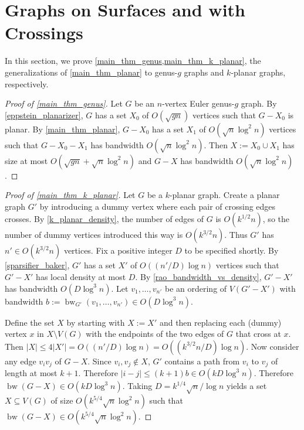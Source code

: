 \documentclass{patmorin}
\renewcommand{\le}{\leqslant}
\DeclareMathOperator{\bw}{bw}
\begin{document}
\section{Graphs on Surfaces and with Crossings}
\label{genus_section}
\label{k_planar_section}

In this section, we prove \cref{main_thm_genus,main_thm_k_planar}, the generalizations of \cref{main_thm_planar} to genus-$g$ graphs and $k$-planar graphs, respectively.

\begin{proof}[Proof of \cref{main_thm_genus}]
  Let $G$ be an $n$-vertex Euler genus-$g$ graph. By \cref{eppstein_planarizer}, $G$ has a set $X_0$ of $O(\sqrt{gn})$ vertices such that $G-X_0$ is planar.  By \cref{main_thm_planar}, $G-X_0$ has a set $X_1$ of $O(\sqrt{n}\log^2 n)$ vertices such that $G-X_0-X_1$ has bandwidth $O(\sqrt{n}\log^2 n)$.  Then $X:=X_0\cup X_1$ has size at most $O(\sqrt{gn}+\sqrt{n}\log^2 n)$ and $G-X$ has bandwidth $O(\sqrt{n}\log^2 n)$.
\end{proof}


\begin{proof}[Proof of \cref{main_thm_k_planar}]
  Let $G$ be a $k$-planar graph.  Create a planar graph $G'$ by introducing a dummy vertex where each pair of crossing edges crosses.  By \cref{k_planar_density}, the number of edges of $G$ is $O(k^{1/2} n)$, so the number of dummy vertices introduced this way is $O(k^{3/2} n)$.  Thus $G'$ has $n'\in O(k^{3/2} n)$ vertices.  Fix a positive integer $D$ to be specified shortly.  By \cref{sparsifier_baker}, $G'$ has a set $X'$ of $O((n'/D)\log n)$ vertices such that $G'-X'$ has local density at most $D$.  By \cref{rao_bandwidth_vs_density}, $G'-X'$ has bandwidth $O(D\log^3 n)$. Let $v_1,\ldots,v_{n'}$ be an ordering of $V(G'-X')$ with bandwidth $b:=\bw_{G'}(v_1,\ldots,v_{n'})\in O(D\log^3 n)$.

  Define the set $X$ by starting with $X:=X'$ and then replacing each (dummy) vertex $x$ in $X\setminus V(G)$ with the endpoints of the two edges of $G$ that cross at $x$.  Then $|X|\le 4|X'|=O((n'/D)\log n)=O((k^{3/2}n/D)\log n)$. Now consider any edge $v_i v_j$ of $G-X$. Since $v_i,v_j\not\in X$, $G'$ contains a path from $v_i$ to $v_j$ of length at most $k+1$.  Therefore $|i-j|\le (k+1)b\in O(kD\log^3 n)$.  Therefore $\bw(G-X)\in O(kD\log^3 n)$.  Taking $D=k^{1/4}\sqrt{n}/\log n$ yields a set $X\subseteq V(G)$ of size $O(k^{5/4}\sqrt{n}\log^2 n)$ such that $\bw(G-X)\in O(k^{5/4}\sqrt{n}\log^2 n)$.
\end{proof}
\end{document}
